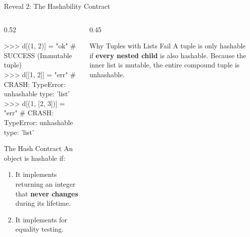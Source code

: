 \begin{frame}[fragile]{Reveal 2: The Hashability Contract}
  \begin{columns}[T,onlytextwidth]
    \begin{column}{0.52\textwidth}
      \begin{TerminalWindow}
>>> d[(1, 2)] = "ok"         \# SUCCESS (Immutable tuple) \\
>>> d[[1, 2]] = "err"        \# CRASH: TypeError: unhashable type: 'list' \\
>>> d[(1, [2, 3])] = "err"   \# CRASH: TypeError: unhashable type: 'list'
      \end{TerminalWindow}
      \vspace{0.12cm}
      \begin{TakeawayBox}{The Hash Contract}
        \scriptsize
        An object is hashable if:
        \begin{enumerate}\setlength{\itemsep}{0.06cm}
          \item It implements  returning an integer that \textbf{never changes} during its lifetime.
          \item It implements  for equality testing.
        \end{enumerate}
      \end{TakeawayBox}
    \end{column}
    \begin{column}{0.45\textwidth}
      \begin{ConceptBox}{Why Tuples with Lists Fail}
        \scriptsize A tuple is only hashable if \textbf{every nested child} is also hashable. Because the inner list is mutable, the entire compound tuple is unhashable.
      \end{ConceptBox}
      \vspace{0.08cm}
    \end{column}
  \end{columns}
\end{frame}

